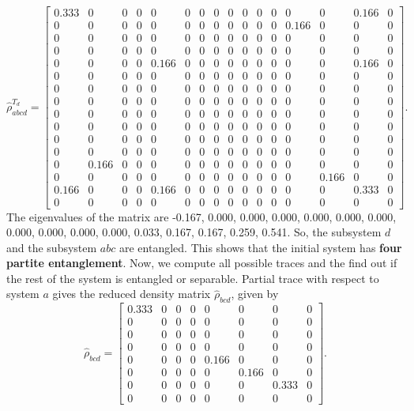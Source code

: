 \documentclass{scrartcl}
\begin{document}
\begin{equation*}
	\hat{\rho}^{T_d}_{abcd} = \left[\begin{array}{cccccccccccccccc}0.333 & 0 & 0 & 0 & 0 & 0 & 0 & 0 & 0 & 0 & 0 & 0 & 0 & 0 & 0.166 & 0\\0 & 0 & 0 & 0 & 0 & 0 & 0 & 0 & 0 & 0 & 0 & 0 & 0.166 & 0 & 0 & 0\\0 & 0 & 0 & 0 & 0 & 0 & 0 & 0 & 0 & 0 & 0 & 0 & 0 & 0 & 0 & 0\\0 & 0 & 0 & 0 & 0 & 0 & 0 & 0 & 0 & 0 & 0 & 0 & 0 & 0 & 0 & 0\\0 & 0 & 0 & 0 & 0.166 & 0 & 0 & 0 & 0 & 0 & 0 & 0 & 0 & 0 & 0.166 & 0\\0 & 0 & 0 & 0 & 0 & 0 & 0 & 0 & 0 & 0 & 0 & 0 & 0 & 0 & 0 & 0\\0 & 0 & 0 & 0 & 0 & 0 & 0 & 0 & 0 & 0 & 0 & 0 & 0 & 0 & 0 & 0\\0 & 0 & 0 & 0 & 0 & 0 & 0 & 0 & 0 & 0 & 0 & 0 & 0 & 0 & 0 & 0\\0 & 0 & 0 & 0 & 0 & 0 & 0 & 0 & 0 & 0 & 0 & 0 & 0 & 0 & 0 & 0\\0 & 0 & 0 & 0 & 0 & 0 & 0 & 0 & 0 & 0 & 0 & 0 & 0 & 0 & 0 & 0\\0 & 0 & 0 & 0 & 0 & 0 & 0 & 0 & 0 & 0 & 0 & 0 & 0 & 0 & 0 & 0\\0 & 0 & 0 & 0 & 0 & 0 & 0 & 0 & 0 & 0 & 0 & 0 & 0 & 0 & 0 & 0\\0 & 0.166 & 0 & 0 & 0 & 0 & 0 & 0 & 0 & 0 & 0 & 0 & 0 & 0 & 0 & 0\\0 & 0 & 0 & 0 & 0 & 0 & 0 & 0 & 0 & 0 & 0 & 0 & 0 & 0.166 & 0 & 0\\0.166 & 0 & 0 & 0 & 0.166 & 0 & 0 & 0 & 0 & 0 & 0 & 0 & 0 & 0 & 0.333 & 0\\0 & 0 & 0 & 0 & 0 & 0 & 0 & 0 & 0 & 0 & 0 & 0 & 0 & 0 & 0 & 0\end{array}\right]
	.
\end{equation*}
The eigenvalues of the matrix are -0.167, 0.000, 0.000, 0.000, 0.000, 0.000, 0.000, 0.000, 0.000, 0.000, 0.000, 0.033, 0.167, 0.167, 0.259, 0.541. So, the subsystem $d$ and the subsystem $abc$ are entangled. This shows that the initial system has \textbf{four partite entanglement}. Now, we compute all possible traces and the find out if the rest of the system is entangled or separable.
Partial trace with respect to system $a$ gives the reduced density matrix $\hat{\rho}_{bcd}$, given by 
\begin{equation*}
	\hat{\rho}_{bcd} = \left[\begin{matrix}0.333 & 0 & 0 & 0 & 0 & 0 & 0 & 0\\0 & 0 & 0 & 0 & 0 & 0 & 0 & 0\\0 & 0 & 0 & 0 & 0 & 0 & 0 & 0\\0 & 0 & 0 & 0 & 0 & 0 & 0 & 0\\0 & 0 & 0 & 0 & 0.166 & 0 & 0 & 0\\0 & 0 & 0 & 0 & 0 & 0.166 & 0 & 0\\0 & 0 & 0 & 0 & 0 & 0 & 0.333 & 0\\0 & 0 & 0 & 0 & 0 & 0 & 0 & 0\end{matrix}\right]
	.
\end{equation*}
\end{document}
